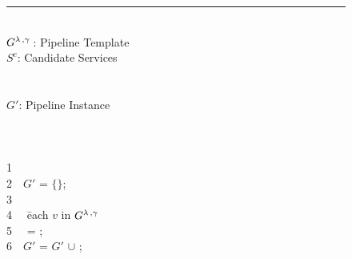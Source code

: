 \newenvironment{redtext}{\footnotesize	\color{gray}}{~~}
\newenvironment{ourcolor}{\color{OurColor}}{~~}
\begin{figure}[!t]

  \hrule\vspace{3pt}
  \begin{ourcolor}
  \begin{tabbing}
      \INPUT\\
      $G^{\lambda\,,\gamma\,}$: Pipeline Template\\
      $S^c$: Candidate Services\\
      ~\\[1pt]
      \OUTPUT\\
      $G'$: Pipeline Instance\\
      ~\\[1pt]
      \\
      \\
      \begin{redtext}1\end{redtext}\\
      \begin{redtext}2\end{redtext}$G'$ = $\{\}$;\\
      \begin{redtext}3\end{redtext}\\
      \begin{redtext}4\end{redtext} \= each $v$ in $G^{\lambda\,,\gamma\,}$\\
      \begin{redtext}5\end{redtext}\tabone \vii{} = ;\\
      \begin{redtext}6\end{redtext}\tabone $G'$ = $G'$ $\cup$ \vii;\\

\end{tabbing}
\end{ourcolor}
\end{figure}
